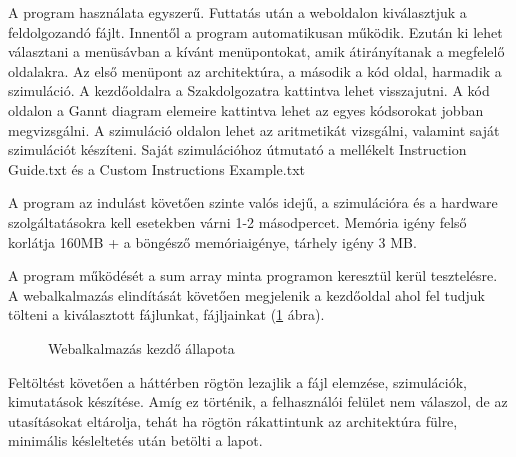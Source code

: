 
A program használata egyszerű. Futtatás után a weboldalon kiválasztjuk a feldolgozandó fájlt. Innentől a program automatikusan működik. Ezután ki lehet választani a menüsávban a kívánt menüpontokat, amik átirányítanak a megfelelő oldalakra. Az első menüpont az architektúra, a második a kód oldal, harmadik a szimuláció. A kezdőoldalra a Szakdolgozatra kattintva lehet visszajutni. A kód oldalon a Gannt diagram elemeire kattintva lehet az egyes kódsorokat jobban megvizsgálni. A szimuláció oldalon lehet az aritmetikát vizsgálni, valamint saját szimulációt készíteni. Saját szimulációhoz útmutató a mellékelt Instruction Guide.txt és a Custom Instructions Example.txt

A program az indulást követően szinte valós idejű, a szimulációra és a hardware szolgáltatásokra kell esetekben várni 1-2 másodpercet. Memória igény felső korlátja 160MB + a böngésző memóriaigénye, tárhely igény 3 MB.

A program működését a sum array minta programon keresztül kerül tesztelésre. A webalkalmazás elindítását követően megjelenik a kezdőoldal ahol fel tudjuk tölteni a kiválasztott fájlunkat, fájljainkat (\ref{fig:start} ábra).

\begin{figure}[h]
\centering
{}
\caption{Webalkalmazás kezdő állapota}
\label{fig:start}
\end{figure}

\newpage
Feltöltést követően a háttérben rögtön lezajlik a fájl elemzése, szimulációk, kimutatások készítése. Amíg ez történik, a felhasználói felület nem válaszol, de az utasításokat eltárolja, tehát ha rögtön rákattintunk az architektúra fülre, minimális késleltetés után betölti a lapot.

